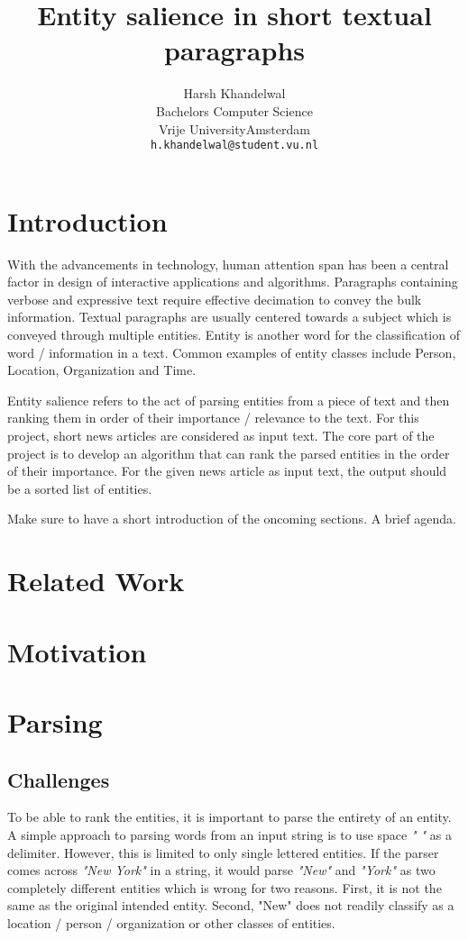 \documentclass{article}
\title{Entity salience in short textual paragraphs}
\author{
	Harsh Khandelwal\\
	Bachelors Computer Science\\
	Vrije UniversityAmsterdam \\
	\texttt{h.khandelwal@student.vu.nl} \\
}
\begin{document}
	\maketitle
	
	\begin{abstract}
		\lipsum[1]
	\end{abstract}
		
	\section{Introduction}
	With the advancements in technology, human attention span has been a central factor in design of interactive applications and algorithms. Paragraphs containing verbose and expressive text require effective decimation to convey the bulk information. Textual paragraphs are usually centered towards a subject which is conveyed through multiple entities. Entity is another word for the classification of word / information in a text. Common examples of entity classes include Person, Location, Organization and Time.\
	
	Entity salience refers to the act of parsing entities from a piece of text and then ranking them in order of their importance / relevance to the text. For this project, short news articles are considered as input text. The core part of the project is to develop an algorithm that can rank the parsed entities in the order of their importance. For the given news article as input text, the output should be a sorted list of entities.
	
	Make sure to have a short introduction of the oncoming sections. A brief agenda.
	
	\section{Related Work}
	
	\section{Motivation} 
	
	\section{Parsing}
		\subsection{Challenges}
		To be able to rank the entities, it is important to parse the entirety of an entity. A simple approach to parsing words from an input string is to use space \textit{" "} as a delimiter. However, this is limited to only single lettered entities. If the parser comes across \textit{"New York"} in a string, it would parse \textit{"New"} and \textit{"York"} as two completely different entities which is wrong for two reasons. First, it is not the same as the original intended entity. Second, "New" does not readily classify as a location / person / organization or other classes of entities.\
		
\end{document}
